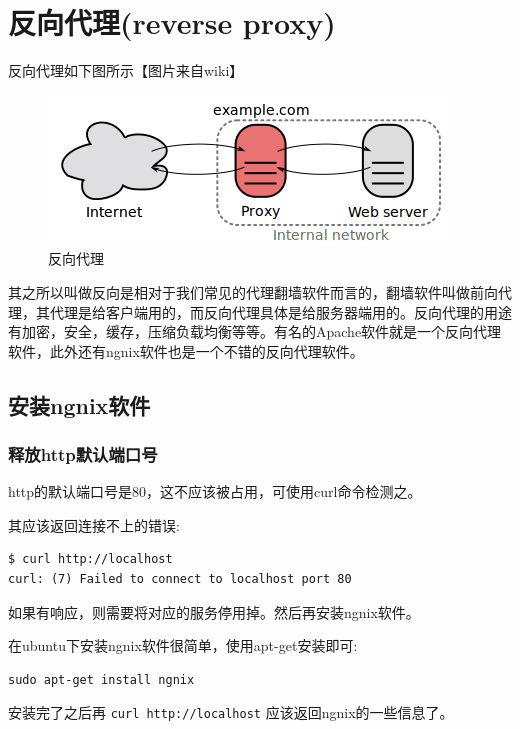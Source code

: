 \documentclass[11pt,a4paper]{sphinxmanual}
\begin{document}
\section{反向代理(reverse proxy)}
\label{sec-13-3}
反向代理如下图所示【图片来自wiki】

\begin{figure}[H]
\centering
\includegraphics[keepaspectratio,max width=0.95\linewidth]{images/反向代理.png}
\caption{反向代理}
\end{figure}

其之所以叫做反向是相对于我们常见的代理翻墙软件而言的，翻墙软件叫做前向代理，其代理是给客户端用的，而反向代理具体是给服务器端用的。反向代理的用途有加密，安全，缓存，压缩负载均衡等等。有名的Apache软件就是一个反向代理软件，此外还有ngnix软件也是一个不错的反向代理软件。

\subsection{安装ngnix软件}
\label{sec-13-3-1}

\subsubsection{释放http默认端口号}
\label{sec-13-3-1-1}
http的默认端口号是80，这不应该被占用，可使用curl命令检测之。

其应该返回连接不上的错误:
\begin{Verbatim}
$ curl http://localhost
curl: (7) Failed to connect to localhost port 80
\end{Verbatim}

如果有响应，则需要将对应的服务停用掉。然后再安装ngnix软件。

在ubuntu下安装ngnix软件很简单，使用apt-get安装即可:
\begin{verbatim}
sudo apt-get install ngnix
\end{verbatim}

安装完了之后再 \verb~curl http://localhost~ 应该返回ngnix的一些信息了。
\end{document}
